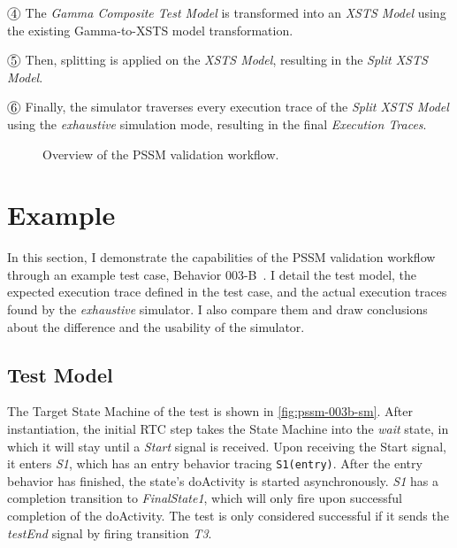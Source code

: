$\cir{4}$ The \textit{Gamma Composite Test Model} is transformed into an \textit{XSTS Model} using the existing Gamma-to-XSTS model transformation.

$\cir{5}$ Then, splitting is applied on the \textit{XSTS Model}, resulting in the \textit{Split XSTS Model}.

$\cir{6}$ Finally, the simulator traverses every execution trace of the \textit{Split XSTS Model} using the \textit{exhaustive} simulation mode, resulting in the final \textit{Execution Traces}.

\begin{figure}[ht]
	\centering
	
	\caption{Overview of the PSSM validation workflow.}
	\label{fig:pssm-val-overview}
\end{figure}

\section{Example}\label{sec:example}

In this section, I demonstrate the capabilities of the PSSM validation workflow through an example test case, Behavior 003-B~\cite{pssm}. I detail the test model, the expected execution trace defined in the test case, and the actual execution traces found by the \textit{exhaustive} simulator. I also compare them and draw conclusions about the difference and the usability of the simulator.

\subsection{Test Model}

The Target State Machine of the test is shown in \autoref{fig:pssm-003b-sm}. After instantiation, the initial RTC step takes the State Machine into the \emph{wait} state, in which it will stay until a \emph{Start} signal is received. Upon receiving the Start signal, it enters \emph{S1}, which has an entry behavior tracing \verb|S1(entry)|. After the entry behavior has finished, the state's doActivity is started asynchronously. \textit{S1} has a completion transition to \emph{FinalState1}, which will only fire upon successful completion of the doActivity. The test is only considered successful if it sends the \emph{testEnd} signal by firing transition \textit{T3}.

